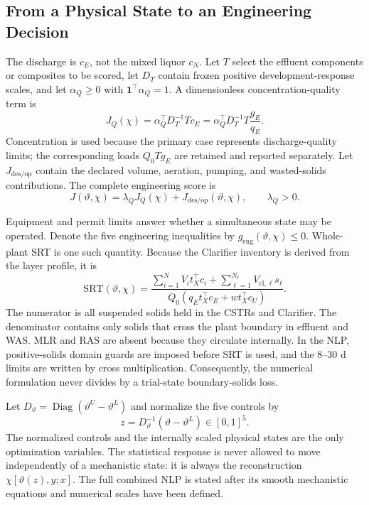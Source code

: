 \documentclass[a4paper,fleqn]{cas-sc}
\newcommand{\diag}{\operatorname{Diag}}
\begin{document}
\subsection{From a Physical State to an Engineering Decision}

The discharge is $c_E$, not the mixed liquor $c_N$. Let $T$ select the effluent components or composites to be scored, let $D_T$ contain frozen positive development-response scales, and let $\alpha_Q\geq0$ with $\mathbf1^\top\alpha_Q=1$. A dimensionless concentration-quality term is
\begin{equation}
\label{eq:quality_objective}
J_Q(\chi)=\alpha_Q^\top D_T^{-1}Tc_E
=\alpha_Q^\top D_T^{-1}T\frac{g_E}{q_E}.
\end{equation}
Concentration is used because the primary case represents discharge-quality limits; the corresponding loads $Q_0Tg_E$ are retained and reported separately. Let $J_{\mathrm{des/op}}$ contain the declared volume, aeration, pumping, and wasted-solids contributions. The complete engineering score is
\begin{equation}
\label{eq:network_objective}
J(\vartheta,\chi)=\lambda_QJ_Q(\chi)+J_{\mathrm{des/op}}(\vartheta,\chi),
\qquad \lambda_Q>0.
\end{equation}

Equipment and permit limits answer whether a simultaneous state may be operated. Denote the five engineering inequalities by $g_{\mathrm{eng}}(\vartheta,\chi)\leq0$. Whole-plant SRT is one such quantity. Because the Clarifier inventory is derived from the layer profile, it is
\begin{equation}
\label{eq:srt}
\mathrm{SRT}(\vartheta,\chi)=
\frac{\displaystyle\sum_{i=1}^{N}V_it_X^\top c_i+
\displaystyle\sum_{\ell=1}^{N_\ell}V_{\mathrm{cl},\ell}s_\ell}
{Q_0\left(q_Et_X^\top c_E+wt_X^\top c_U\right)}.
\end{equation}
The numerator is all suspended solids held in the CSTRs and Clarifier. The denominator contains only solids that cross the plant boundary in effluent and WAS. MLR and RAS are absent because they circulate internally. In the NLP, positive-solids domain guards are imposed before SRT is used, and the 8--30 d limits are written by cross multiplication. Consequently, the numerical formulation never divides by a trial-state boundary-solids loss.

Let $D_\vartheta=\diag(\vartheta^U-\vartheta^L)$ and normalize the five controls by
\begin{equation}
\label{eq:network_normalization}
z=D_\vartheta^{-1}(\vartheta-\vartheta^L)\in[0,1]^5.
\end{equation}
The normalized controls and the internally scaled physical states are the only optimization variables. The statistical response is never allowed to move independently of a mechanistic state: it is always the reconstruction $\chi[\vartheta(z),y;x]$. The full combined NLP is stated after its smooth mechanistic equations and numerical scales have been defined.
\end{document}
